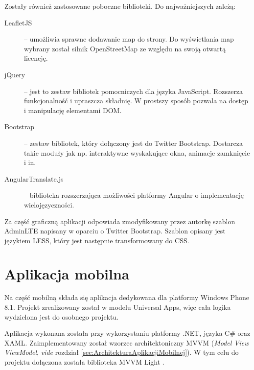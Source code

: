 \documentclass{book}
\begin{document}
		Zostały również zastosowane poboczne biblioteki. Do najważniejszych zależą:
		
		\begin{description}
			
			\item[LeafletJS] \cite{id:Leaflet} -- 
			umożliwia sprawne dodawanie map do strony. Do wyświetlania map wybrany został silnik OpenStreetMap \cite{id:OpenStreetMaps} ze względu na swoją otwartą licencję.
			\item[jQuery] \cite{id:jQuery} -- 
			jest to zestaw bibliotek pomocniczych dla języka JavaScript. Rozszerza funkcjonalność i upraszcza składnię. W prostszy sposób pozwala na dostęp i manipulację elementami DOM.
			\item[Bootstrap] \cite{id:Bootstrap} -- 
			zestaw bibliotek, który dołączony jest do Twitter Bootstrap. Dostarcza takie moduły jak np. interaktywne wyskakujące okna, animacje zamknięcie i in.
			\item[AngularTranslate.js] \cite{id:AngularTranslate} -- 
			biblioteka rozszerzająca możliwości platformy Angular o implementację wielojęzyczności.  
		
		\end{description}
				
		Za część graficzną aplikacji odpowiada zmodyfikowany przez autorkę szablon AdminLTE \cite{id:AdminLTE} napisany w oparciu o Twitter Bootstrap. Szablon opisany jest językiem LESS, który jest następnie transformowany do CSS.
		
		\section{Aplikacja mobilna}
		
	
		Na część mobilną składa się aplikacja dedykowana dla platformy Windows Phone 8.1. Projekt zrealizowany został w modelu Universal Apps, więc cała logika wydzielona jest do osobnego projektu.
		
		Aplikacja wykonana została przy wykorzystaniu platformy .NET, języka C\# oraz XAML. Zaimplementowany został wzorzec architektoniczny MVVM (\emph{Model View ViewModel}, \emph{vide} rozdział \ref{sec:ArchitekturaAplikacjiMobilnej}). W tym celu do projektu dołączona została biblioteka MVVM Light \cite{id:MVVMLight}. 
		
\end{document}
